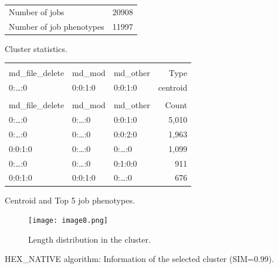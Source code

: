 \documentclass{jhps}
\begin{document}
\begin{cluster}
	\begin{subtable}{\textwidth}
		\centering
		\begin{tabular}{ll}
			Number of jobs & 20908 \\
			Number of job phenotypes & 11997 \\
		\end{tabular}
		\caption{Cluster statistics.}
		\label{cluster:hex_native:stats}
	\end{subtable}
	\medskip
	\begin{subtable}{\textwidth}
		\centering
		\begin{tiny}
			\begin{tabular}{lll|r}
				\rowcolor{tblhead}
				\multicolumn{3}{l|}{Hexadecimal coding} &            \\
				\rowcolor{tblhead}
				md\_file\_delete     &  md\_mod   & md\_other & Type     \\
				\hline
				0:\dots:0            &  0:0:1:0   & 0:0:1:0   & centroid \\
				\multicolumn{4}{l}{} \\
				\rowcolor{tblhead}
				md\_file\_delete     &  md\_mod   & md\_other & Count    \\
				\hline
				0:\dots:0            &  0:\dots:0 & 0:0:1:0   & 5,010    \\
				0:\dots:0            &  0:\dots:0 & 0:0:2:0   & 1,963    \\
				0:0:1:0              &  0:\dots:0 & 0:\dots:0 & 1,099    \\
				0:\dots:0            &  0:\dots:0 & 0:1:0:0   & 911      \\
				0:0:1:0              &  0:0:1:0   & 0:\dots:0 & 676      \\
			\end{tabular}
		\end{tiny}
		\caption{Centroid and Top 5 job phenotypes.}
		\label{cluster:hex_native:top_jobs}
	\end{subtable}
	\medskip
	\begin{subfigure}{\textwidth}
		\centering
		\texttt{[image: image8.png]}
		\caption{Length distribution in the cluster.}
		\label{cluster:hex_native:length}
	\end{subfigure}
	\caption{HEX\_NATIVE algorithm: Information of the selected cluster (SIM=0.99).}
	\label{cluster:hex_native}
\end{cluster}

\FloatBarrier
\end{document}
